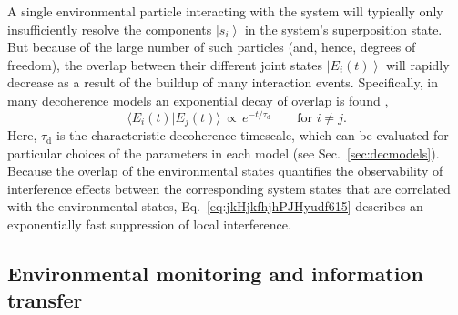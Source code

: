 \documentclass[3p,sort&compress,12pt]{elsarticle}
\newcommand{\ket}[1]{\left\vert{#1}\right\rangle}
\newcommand{\braket}[2]{\ensuremath{{\langle #1}|{#2 \rangle}}}
\newcommand{\E}{\ensuremath{e}}
\begin{document}
A single environmental particle interacting with the system will typically only insufficiently resolve the components $\ket{s_i}$ in the system's superposition state. But because of the large number of such particles (and, hence, degrees of freedom), the overlap between their different joint states $\ket{E_i(t)}$ will rapidly decrease as a result of the buildup of many interaction events. Specifically, in many decoherence models an exponential decay of overlap is found \cite{Zurek:1982:tv,Joos:1985:iu,Paz:1993:ta,Leggett:1987:pm,Mokarzel:2002:za,Hornberger:2003:un,Zurek:2002:ii,Schlosshauer:2007:un,Breuer:2002:oq},
%
\begin{equation}
  \label{eq:jkHjkfhjhPJHyudf615}
  \braket{E_i(t)}{E_j(t)} \, \propto \, \E^{-t/\tau_\text{d}} \qquad \text{for $i \not= j$}.
\end{equation}
%
Here, $\tau_\text{d}$ is the characteristic decoherence timescale, which can be evaluated for particular choices of the parameters in each model (see Sec.~\ref{sec:decmodels}). Because the overlap of the environmental states quantifies the observability of interference effects between the corresponding system states that are correlated with the environmental states, Eq.~\eqref{eq:jkHjkfhjhPJHyudf615} describes an exponentially fast suppression of local interference.

\subsection{\label{sec:envir-monit-inform}Environmental monitoring and information transfer}
\end{document}
